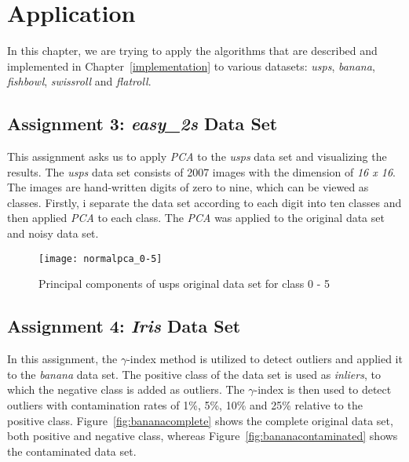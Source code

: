 \chapter{Application}
\label{chap:application}

In this chapter, we are trying to apply the algorithms that are described and implemented in Chapter~\ref{implementation} to various datasets: \textit{usps}, \textit{banana}, \textit{fishbowl}, \textit{swissroll} and \textit{flatroll}.


\section{Assignment 3: \textit{easy_2s} Data Set}
\label{assignment3}

This assignment asks us to apply \textit{PCA} to the \textit{usps} data set and visualizing the results. The \textit{usps} data set consists of 2007 images with the dimension of \textit{16 x 16}. The images are hand-written digits of zero to nine, which can be viewed as classes. Firstly, i separate the data set according to each digit into ten classes and then applied \textit{PCA} to each class. The \textit{PCA} was applied to the original data set and noisy data set.



\begin{figure}[h!]
	\centering
	\texttt{[image: normalpca\_0-5]}
	\caption{Principal components of usps original data set for class 0 - 5}
	\label{fig:pcaOriginal05}
\end{figure}


\section{Assignment 4: \textit{Iris} Data Set}
\label{assignment4}

In this assignment, the $\gamma$-index method is utilized to detect outliers and applied it to the \textit{banana} data set. The positive class of the data set is used as \textit{inliers}, to which the negative class is added as outliers. The $\gamma$-index is then used to detect outliers with contamination rates of 1\%, 5\%, 10\% and 25\% relative to the positive class. Figure~\ref{fig:bananacomplete} shows the complete original data set, both positive and negative class, whereas Figure~\ref{fig:bananacontaminated} shows the contaminated data set.

